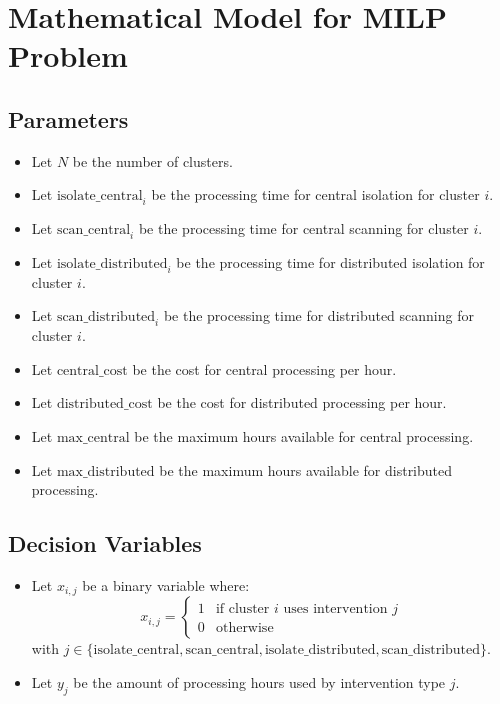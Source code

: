 \documentclass{article}
\begin{document}
\section*{Mathematical Model for MILP Problem}

\subsection*{Parameters}
\begin{itemize}
    \item Let \( N \) be the number of clusters.
    \item Let \( \text{isolate\_central}_i \) be the processing time for central isolation for cluster \( i \).
    \item Let \( \text{scan\_central}_i \) be the processing time for central scanning for cluster \( i \).
    \item Let \( \text{isolate\_distributed}_i \) be the processing time for distributed isolation for cluster \( i \).
    \item Let \( \text{scan\_distributed}_i \) be the processing time for distributed scanning for cluster \( i \).
    \item Let \( \text{central\_cost} \) be the cost for central processing per hour.
    \item Let \( \text{distributed\_cost} \) be the cost for distributed processing per hour.
    \item Let \( \text{max\_central} \) be the maximum hours available for central processing.
    \item Let \( \text{max\_distributed} \) be the maximum hours available for distributed processing.
\end{itemize}

\subsection*{Decision Variables}
\begin{itemize}
    \item Let \( x_{i, j} \) be a binary variable where:
        \[
        x_{i, j} = 
        \begin{cases} 
        1 & \text{if cluster } i \text{ uses intervention } j \\
        0 & \text{otherwise}
        \end{cases}
        \]
        with \( j \in \{\text{isolate\_central}, \text{scan\_central}, \text{isolate\_distributed}, \text{scan\_distributed}\} \).
    \item Let \( y_{j} \) be the amount of processing hours used by intervention type \( j \).
\end{itemize}
\end{document}
